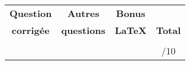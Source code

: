 {
\centering

\vfill


\vfill

{
\renewcommand{\arraystretch}{1.5}
\begin{center}
\begin{tabular}{|c|c|c||c|} \hline
{\bf \Large Question}							& {\bf \Large Autres}			& 	{\bf \Large Bonus}	&  \\ 
{\bf \Large corrig\'ee}						& {\bf \Large  questions}	&		{\bf \Large \LaTeX}	& {\bf \Large Total} \\ \hline
\hspace{20mm}			{\Huge \strut}	& \hspace{20mm}						&		\hspace{20mm}				&\hspace{20mm} \\
\hspace{20mm}			{\Huge \strut}	& \hspace{20mm}						&		\hspace{20mm} 			& \hspace{20mm} {\Large /10} \\ \hline
\end{tabular}
\end{center}
}


\vfill
}

\restoregeometry
%
